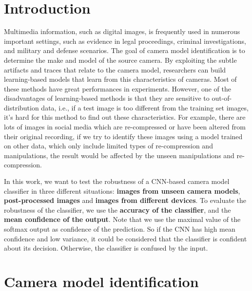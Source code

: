 \documentclass[a4paper, 9pt, twocolumn]{extarticle}
\begin{document}
\section{Introduction}
\label{section:introduction}

Multimedia information, such as digital images, is frequently used in numerous important settings, such as evidence in legal proceedings, criminal investigations, and military and defense scenarios. The goal of camera model identification is to determine the make and model of the source camera. By exploiting the subtle artifacts and traces that relate to the camera model, researchers can build learning-based models that learn from this characteristics of cameras. Most of these methods have great performances in experiments. However, one of the disadvantages of learning-based methods is that they are sensitive to out-of-distribution data, i.e., if a test image is too different from the training set images, it's hard for this method to find out these characteristics. For example, there are lots of images in social media which are re-compressed or have been altered from their original recording, if we try to identify these images using a model trained on other data, which only include limited types of re-compression and manipulations, the result would be affected by the unseen manipulations and re-compression.

In this work, we want to test the robustness of a CNN-based camera model classifier in three different situations: \textbf{images from unseen camera models}, \textbf{post-processed images} and \textbf{images from different devices}. To evaluate the robustness of the classifier, we use the \textbf{accuracy of the classifier}, and the \textbf{mean confidence of the output}. Note that we use the maximal value of the softmax output as confidence of the prediction. So if the CNN has high mean confidence and low variance, it could be considered that the classifier is confident about its decision. Otherwise, the classifier is confused by the input.

\section{Camera model identification}
\label{section:camera model identification}
\end{document}

